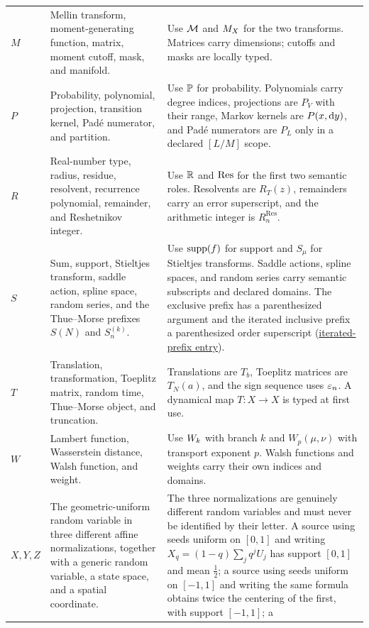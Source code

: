 \documentclass[11pt,oneside]{article}
\theoremstyle{definition}
\theoremstyle{remark}
\begin{document}
\begin{longtable}{@{}p{}p{}p{}@{}}
$M$ & Mellin transform, moment-generating function, matrix, moment cutoff, mask, and
manifold. & Use $\mathcal{M}$ and $M_{X}$ for the two
transforms.  Matrices carry dimensions; cutoffs and masks are locally typed.\\
$P$ & Probability, polynomial, projection, transition kernel, Padé numerator, and
partition. & Use $\mathbb{P}$ for probability.  Polynomials carry degree indices,
projections are $P_V$ with their range, Markov kernels are $P(x,\mathop{}\!\mathrm{d} y)$, and
Padé numerators are $P_L$ only in a declared $[L/M]$ scope.\\
$R$ & Real-number type, radius, residue, resolvent, recurrence polynomial, remainder,
and Reshetnikov integer. & Use $\mathbb{R}$ and $\operatorname*{Res}$ for the first two
semantic roles.  Resolvents are $R_T(z)$, remainders carry an error superscript, and the
arithmetic integer is $R_n^{\mathrm{Res}}$.\\
$S$ & Sum, support, Stieltjes transform, saddle action, spline space, random series,
and the Thue--Morse prefixes $S(N)$ and $S^{(k)}_n$. &
Use $\operatorname{supp}\!\left(f\right)$ for support and $S_\mu$ for Stieltjes transforms.  Saddle actions,
spline spaces, and random series carry semantic subscripts and declared domains.  The
exclusive prefix has a parenthesized argument and the iterated inclusive prefix a
parenthesized order superscript
(\hyperlink{notation:thue-morse-iterated-prefix}{iterated-prefix entry}).\\
$T$ & Translation, transformation, Toeplitz matrix, random time, Thue--Morse object, and
truncation. & Translations are $T_b$, Toeplitz matrices are $T_N(a)$, and the sign
sequence uses $\varepsilon_{n}$.  A dynamical map $T:X\to X$ is typed at first use.\\
$W$ & Lambert function, Wasserstein distance, Walsh function, and weight. & Use
$W_k$ with branch $k$ and $W_p(\mu,\nu)$ with transport exponent $p$.  Walsh
functions and weights carry their own indices and domains.\\
$X,Y,Z$ & The geometric-uniform random variable in three different affine
normalizations, together with a generic random variable, a state space, and a
spatial coordinate. & The three normalizations are genuinely different random
variables and must never be identified by their letter.  A source using seeds
uniform on $[0,1]$ and writing $X_q=(1-q)\sum_jq^jU_j$ has support $[0,1]$ and
mean $\tfrac12$; a source using seeds uniform on $[-1,1]$ and writing the same
formula obtains twice the centering of the first, with support $[-1,1]$; a

\end{longtable}
\end{document}
